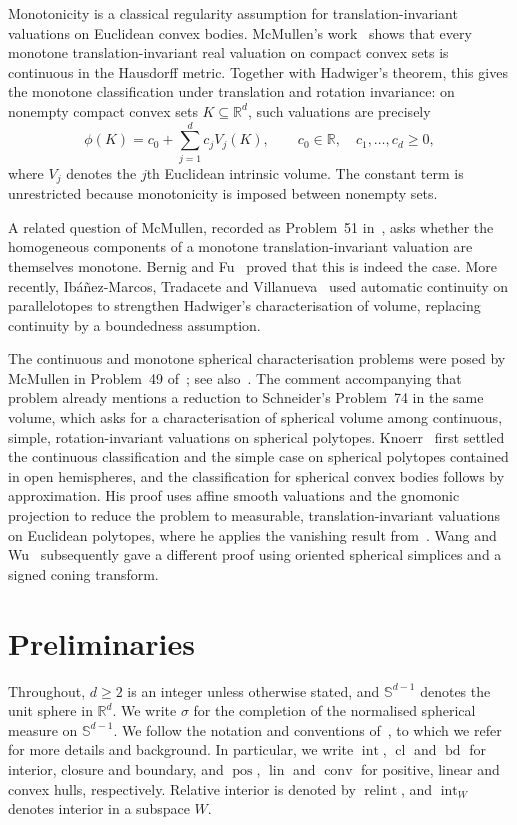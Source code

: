 \documentclass[11pt]{article}
\newcommand{\R}{\mathbb{R}}
\newcommand{\sphere}[1]{\mathbb{S}^{#1}}
\newcommand{\pos}{\operatorname{pos}}
\newcommand{\lin}{\operatorname{lin}}
\newcommand{\relint}{\operatorname{relint}}
\newcommand{\inter}{\operatorname{int}}
\newcommand{\cl}{\operatorname{cl}}
\newcommand{\bd}{\operatorname{bd}}
\theoremstyle{plain}
\theoremstyle{definition}
\begin{document}
Monotonicity is a classical regularity assumption for translation-invariant
valuations on Euclidean convex bodies.  McMullen's
work~\cite{McM77:Valuations-Polytopes,McM90:Monotone-Valuations} shows
that every monotone translation-invariant real valuation on compact
convex sets is continuous in the Hausdorff metric.  Together with
Hadwiger's theorem, this gives the monotone classification under
translation and rotation invariance: on nonempty compact convex sets
$K\subseteq\R^d$, such valuations are precisely
\[
  \phi(K)=c_0+\sum_{j=1}^d c_jV_j(K),
  \qquad c_0\in\R,\quad c_1,\ldots,c_d\ge0,
\]
where $V_j$ denotes the $j$th Euclidean intrinsic volume.  The constant
term is unrestricted because monotonicity is imposed between nonempty
sets.

A related question of McMullen, recorded as
Problem~51 in~\cite{Gruber1979}, asks whether the homogeneous components
of a monotone translation-invariant valuation are themselves monotone.
Bernig and Fu~\cite[Theorem~2.12]{BF11:Hermitian-Integral-Geometry}
proved that this is indeed the case.  More recently, Ib\'a\~nez-Marcos,
Tradacete and Villanueva~\cite{ITV25:Noncontinuous-Valuations} used
automatic continuity on parallelotopes to strengthen Hadwiger's
characterisation of volume, replacing continuity by a boundedness
assumption.

The continuous and monotone spherical characterisation problems were
posed by McMullen in Problem~49 of~\cite{Gruber1979}; see
also~\cite[Section~3.3]{Sch22:Convex-Cones}.  The comment accompanying
that problem already mentions a reduction to Schneider's Problem~74 in the same volume,
which asks for a characterisation of spherical volume among continuous,
simple, rotation-invariant valuations on spherical polytopes.
Knoerr~\cite[Theorems~A and~B]{Knoerr:Spherical-Hadwiger} first settled the
continuous classification and the simple case on spherical polytopes contained
in open hemispheres, and the classification for spherical convex bodies follows
by approximation. His proof uses affine smooth valuations and the gnomonic
projection to reduce the problem to measurable, translation-invariant
valuations on Euclidean polytopes, where he applies the vanishing result
from~\cite[Proposition~5.4]{Knoerr:Polytopal-Hadwiger}.
Wang and Wu~\cite{WangWu:Spherical-Hadwiger} subsequently gave a different
proof using oriented spherical simplices and a signed coning transform.

\section{Preliminaries}\label{sec:preliminaries}
Throughout, $d\ge2$ is an integer unless otherwise stated, and
$\sphere{d-1}$ denotes the unit sphere in $\R^d$.
We write $\sigma$ for the completion of the normalised spherical measure on $\sphere{d-1}$.
We follow the notation and conventions of~\cite{Sch22:Convex-Cones}, to which we refer for more details
and background. In particular, we write $\inter$, $\cl$ and $\bd$ for interior, closure
and boundary, and $\pos$, $\lin$ and $\operatorname{conv}$ for positive,
linear and convex hulls, respectively.  Relative interior is denoted by
$\relint$, and $\inter_W$ denotes interior in a subspace $W$.
\end{document}
